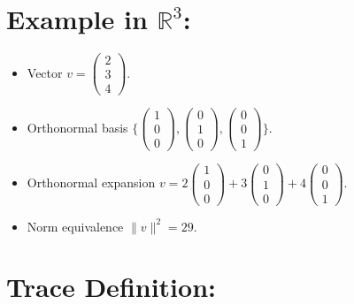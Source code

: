 \documentclass{article}
\begin{document}
\section{Example in $\mathbb{R}^3$:}
\begin{itemize}
    \item Vector $v = \begin{pmatrix} 2 \\ 3 \\ 4 \end{pmatrix}$.
    \item Orthonormal basis $\{ \begin{pmatrix} 1 \\ 0 \\ 0 \end{pmatrix}, \begin{pmatrix} 0 \\ 1 \\ 0 \end{pmatrix}, \begin{pmatrix} 0 \\ 0 \\ 1 \end{pmatrix} \}$.
    \item Orthonormal expansion $v = 2 \begin{pmatrix} 1 \\ 0 \\ 0 \end{pmatrix} + 3 \begin{pmatrix} 0 \\ 1 \\ 0 \end{pmatrix} + 4 \begin{pmatrix} 0 \\ 0 \\ 1 \end{pmatrix}$.
    \item Norm equivalence $\| v \|^2 = 29$.
\end{itemize}












\section{Trace Definition:}
    
\end{document}
